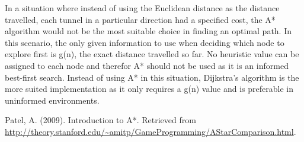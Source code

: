 \documentclass[12pt, a4paper]{article}
\begin{document}
    In a situation where instead of using the Euclidean distance as the distance travelled, each tunnel in a particular direction had a specified cost, the A* algorithm would not be the most suitable choice in finding an optimal path. In this scenario, the only given information to use when deciding which node to explore first is g(n), the exact distance travelled so far. No heuristic value can be assigned to each node and therefor A* should not be used as it is an informed best-first search.
    Instead of using A* in this situation, Dijkstra's algorithm is the more suited implementation as it only requires a g(n) value and is preferable in uninformed environments.
    
    
    
    

%
%
%
\begin{thebibliography}{8}
Patel, A. (2009). Introduction to A*. Retrieved from \url{http://theory.stanford.edu/~amitp/GameProgramming/AStarComparison.html}.


\end{thebibliography}		
\end{document}
